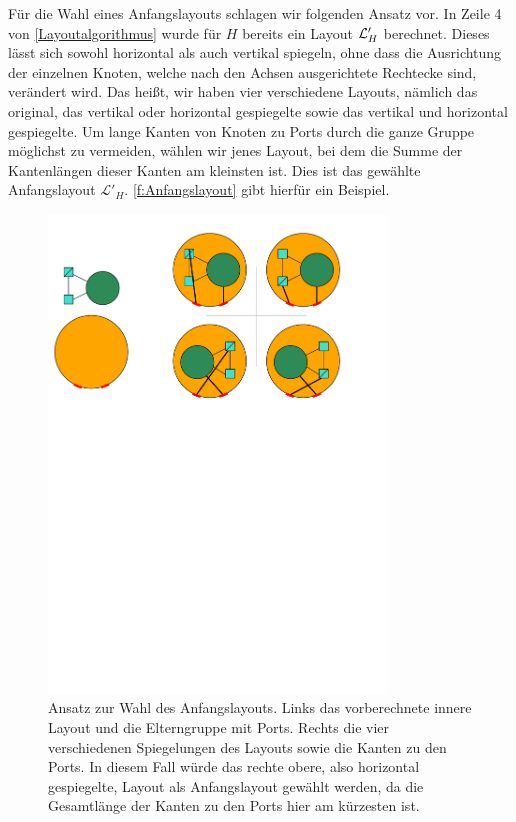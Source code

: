 Für die Wahl eines Anfangslayouts schlagen wir folgenden Ansatz vor.
In Zeile 4 von \autoref{Layoutalgorithmus} wurde für $H$ bereits ein Layout $\mathcal{L}'_H$ berechnet. 
Dieses lässt sich sowohl horizontal als auch vertikal spiegeln, ohne dass die Ausrichtung der einzelnen Knoten, welche nach den Achsen ausgerichtete Rechtecke sind, verändert wird.
Das heißt, wir haben vier verschiedene Layouts, nämlich das original, das vertikal oder horizontal gespiegelte sowie das vertikal und horizontal gespiegelte.
Um lange Kanten von Knoten zu Ports durch die ganze Gruppe möglichst zu vermeiden, wählen wir jenes Layout,
bei dem die Summe der Kantenlängen dieser Kanten am kleinsten ist. Dies ist das gewählte Anfangslayout $\mathcal{L}'_H$.
\autoref{f:Anfangslayout} gibt hierfür ein Beispiel.

\begin{figure}[t]%
\begin{center} 
  \includegraphics[width=0.8\textwidth]{Pics/Anfangslayout.pdf}
  \caption{Ansatz zur Wahl des Anfangslayouts. Links das vorberechnete innere Layout und die Elterngruppe mit Ports. Rechts die vier verschiedenen Spiegelungen des Layouts sowie die Kanten zu den Ports.
  In diesem Fall würde das rechte obere, also horizontal gespiegelte, Layout als Anfangslayout gewählt werden, da die Gesamtlänge der Kanten zu den Ports hier am kürzesten ist.}
  \label{f:Anfangslayout}
\end{center}
\end{figure}



